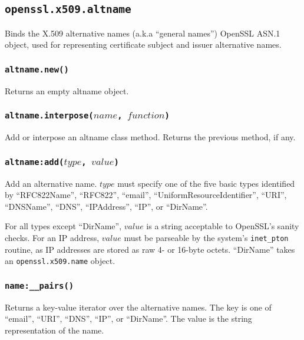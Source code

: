 \documentclass[11pt, oneside]{memoir}
\newcommand*{\fn}[1]{\texttt{#1}\xspace}
\newcommand*{\module}[1]{\texttt{#1}\xspace}
\newcounter{toccols}
\newenvironment{Module}[1]{
	\subsection{\texttt{#1}}
	\addtocontents{toc}{
		\protect\begin{multicols}{\value{toccols}}
	}
}{
	\addtocontents{toc}{\protect\end{multicols}}
}
\begin{document}
\begin{Module}{openssl.x509.altname}

Binds the X.509 alternative names (a.k.a ``general names'') OpenSSL ASN.1 object, used for representing certificate subject and issuer alternative names.

\subsubsection[\fn{altname.new}]{\fn{altname.new()}}

Returns an empty altname object.

\subsubsection[\fn{altname.interpose}]{\fn{altname.interpose($name$, $function$)}}

Add or interpose an altname class method. Returns the previous method, if any.

\subsubsection[\fn{altname:add}]{\fn{altname:add($type$, $value$)}}

Add an alternative name. $type$ must specify one of the five basic types identified by ``RFC822Name'', ``RFC822'', ``email'', ``UniformResourceIdentifier'', ``URI'', ``DNSName'', ``DNS'', ``IPAddress'', ``IP'', or ``DirName''.

For all types except ``DirName'', $value$ is a string acceptable to OpenSSL's sanity checks. For an IP address, $value$ must be parseable by the system's \fn{inet\_pton} routine, as IP addresses are stored as raw 4- or 16-byte octets. ``DirName'' takes an \module{openssl.x509.name} object.

\subsubsection[\fn{name:\_\_pairs}]{\fn{name:\_\_pairs()}}

Returns a key-value iterator over the alternative names. The key is one of ``email'', ``URI'', ``DNS'', ``IP'', or ``DirName''. The value is the string representation of the name.

\end{Module}
\end{document}
